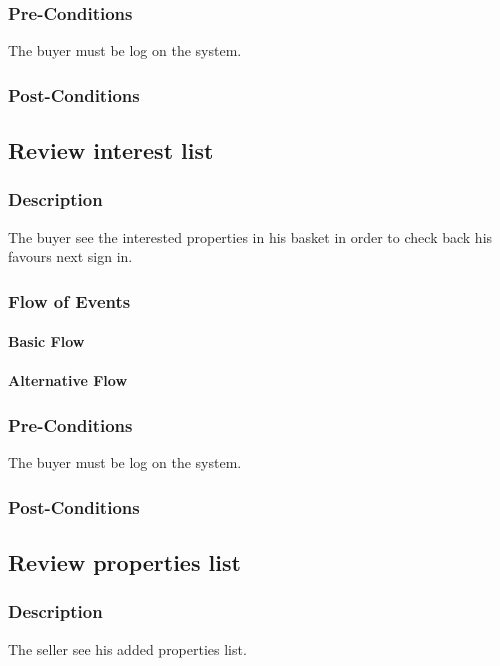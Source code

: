 \documentclass[a4paper,12pt]{article}
\begin{document}
\subsubsection{Pre-Conditions}
The buyer must be log on the system.
\subsubsection{Post-Conditions}

\subsection{Review interest list}
\subsubsection{Description}
The buyer see the interested properties in his basket in order to check back his favours next sign in.
\subsubsection{Flow of Events}
\paragraph{Basic Flow}
\begin{itemize}
\end{itemize}
\paragraph{Alternative Flow}
\begin{itemize}
\end{itemize}
\subsubsection{Pre-Conditions}
The buyer must be log on the system.
\subsubsection{Post-Conditions}


\subsection{Review properties list}
\subsubsection{Description}
The seller see his added properties list.
\end{document}
